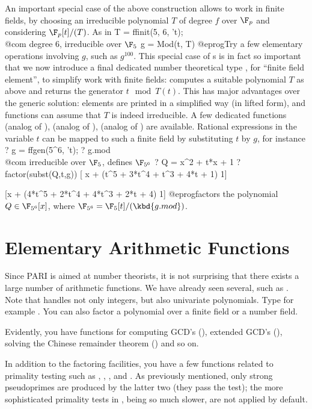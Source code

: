 An important special case of the above construction allows to work in finite
fields, by choosing an irreducible polynomial $T$ of degree $f$ over $\F_p$
and considering $\F_p[t]/(T)$. As in
\bprog
  T = ffinit(5, 6, 't); \\ @com degree 6, irreducible over $\F_5$
  g = Mod(t, T)
@eprog\noindent Try a few elementary operations involving $g$, such as
$g^{100}$. This special case of s is in fact so important that we
now introduce a final dedicated number theoretical type , for
``finite field element'', to simplify work with finite fields:  computes a suitable polynomial $T$ as above and returns
the generator $t \mod T(t)$. This has major advantages over the generic
 solution: elements are printed in a simplified way (in lifted
form), and functions can assume that $T$ is indeed irreducible. A few dedicated
functions   (analog of ), 
(analog of ),  (analog of ) are available.
Rational expressions in the variable $t$ can be mapped to such a finite
field by substituting $t$ by $g$, for instance
\bprog
  ? g = ffgen(5^6, 't);
  ? g.mod  \\ @com irreducible over $\F_5$, defines $\F_{5^6}$
  ? Q = x^2 + t*x + 1
  ? factor(subst(Q,t,g))
  [    x + (t^5 + 3*t^4 + t^3 + 4*t + 1) 1]

  [x + (4*t^5 + 2*t^4 + 4*t^3 + 2*t + 4) 1]
@eprog\noindent factors the polynomial $Q \in \F_{5^6}[x]$, where
$\F_{5^6} = \F_5[t]/(\kbd{g.mod})$.

\section{Elementary Arithmetic Functions}

Since PARI is aimed at number theorists, it is not surprising that there
exists a large number of arithmetic functions. We have already seen several,
such as . Note that  handles not only integers, but
also univariate polynomials. Type for example .
You can also factor a polynomial over a finite field or a number field.

Evidently, you have functions for computing GCD's (), extended GCD's
(), solving the Chinese remainder theorem () and so
on.

In addition to the factoring facilities, you have a few functions related to
primality testing such as , ,
, and . As previously mentioned, only strong
pseudoprimes are produced by the latter two (they pass the
 test); the more sophisticated primality tests in
, being so much slower, are not applied by default.


